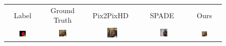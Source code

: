 \addtolength{\tabcolsep}{-4.5pt}    
\bgroup
\def\arraystretch{0.5}%
\begin{figure}[]
\begin{tabular} {cc|cc|c}
 Label & Ground Truth & Pix2PixHD~\cite{wang2018pix2pixHD} &  SPADE~\cite{park2019SPADE} & Ours\\

\includegraphics[width=0.1932\textwidth]{Images/Rec/Faces/label/28360.png} & \includegraphics[width=0.1932\textwidth]{Images/Rec/Faces/gt/28360.jpg} &
\includegraphics[width=0.1932\textwidth]{Images/Rec/Faces/pix2pixhd/28360.jpg}&
\includegraphics[width=0.1932\textwidth]{Images/Rec/Faces/spade/28360.jpg} &  \includegraphics[width=0.1932\textwidth]{Images/Rec/Faces/ours/28360.png} \\



\end{tabular}
\end{figure}
